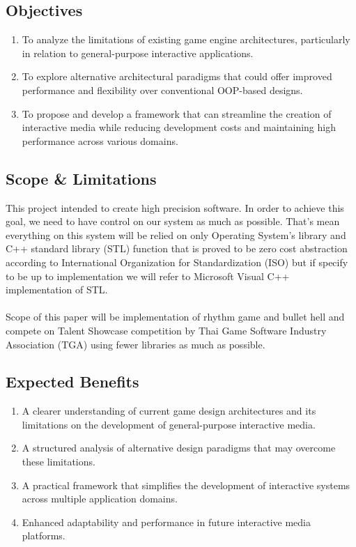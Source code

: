 \subsection{Objectives}
\label{subsec:objectives}

\begin{enumerate}
    \item To analyze the limitations of existing game engine architectures, particularly in relation to general-purpose interactive applications.
    \item To explore alternative architectural paradigms that could offer improved performance and flexibility over conventional OOP-based designs.
    \item To propose and develop a framework that can streamline the creation of interactive media while reducing development costs and maintaining high performance across various domains.
\end{enumerate}

\subsection{Scope \& Limitations}
\label{subsec:scope-and-limitation}
This project intended to create high precision software.
In order to achieve this goal, we need to have control on our system as much as possible.
That's mean everything on this system will be relied on only Operating System's library and
C++ standard library (STL) function that is proved to be zero cost abstraction according to
International Organization for Standardization (ISO) but if specify to be up to implementation
we will refer to Microsoft Visual C++ implementation of STL\@.
\\\\
Scope of this paper will be implementation of rhythm game and bullet hell and
compete on Talent Showcase competition by Thai Game Software Industry Association (TGA)
using fewer libraries as much as possible.

\subsection{Expected Benefits}
\label{subsec:expected-benefits}

\begin{enumerate}
    \item A clearer understanding of current game design architectures and its limitations on the development of general-purpose interactive media.
    \item A structured analysis of alternative design paradigms that may overcome these limitations.
    \item A practical framework that simplifies the development of interactive systems across multiple application domains.
    \item Enhanced adaptability and performance in future interactive media platforms.
\end{enumerate}